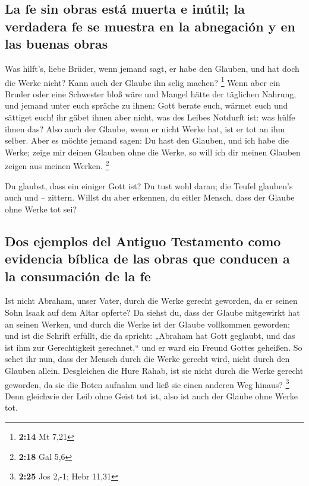 \hypertarget{la-fe-sin-obras-estuxe1-muerta-e-inuxfatil-la-verdadera-fe-se-muestra-en-la-abnegaciuxf3n-y-en-las-buenas-obras}{%
\subsection{La fe sin obras está muerta e inútil; la verdadera fe se
muestra en la abnegación y en las buenas
obras}\label{la-fe-sin-obras-estuxe1-muerta-e-inuxfatil-la-verdadera-fe-se-muestra-en-la-abnegaciuxf3n-y-en-las-buenas-obras}}

 Was hilft's, liebe Brüder, wenn jemand sagt, er habe den
Glauben, und hat doch die Werke nicht? Kann auch der Glaube ihn selig
machen? \footnote{\textbf{2:14} Mt 7,21}  Wenn aber ein
Bruder oder eine Schwester bloß wäre und Mangel hätte der täglichen
Nahrung,  und jemand unter euch spräche zu ihnen: Gott
berate euch, wärmet euch und sättiget euch! ihr gäbet ihnen aber nicht,
was des Leibes Notdurft ist: was hülfe ihnen das?  Also
auch der Glaube, wenn er nicht Werke hat, ist er tot an ihm selber.
 Aber es möchte jemand sagen: Du hast den Glauben, und
ich habe die Werke; zeige mir deinen Glauben ohne die Werke, so will ich
dir meinen Glauben zeigen aus meinen Werken. \footnote{\textbf{2:18} Gal
  5,6}

 Du glaubst, dass ein einiger Gott ist? Du tust wohl
daran; die Teufel glauben's auch und -- zittern.  Willst
du aber erkennen, du eitler Mensch, dass der Glaube ohne Werke tot sei?

\hypertarget{dos-ejemplos-del-antiguo-testamento-como-evidencia-buxedblica-de-las-obras-que-conducen-a-la-consumaciuxf3n-de-la-fe}{%
\subsection{Dos ejemplos del Antiguo Testamento como evidencia bíblica
de las obras que conducen a la consumación de la
fe}\label{dos-ejemplos-del-antiguo-testamento-como-evidencia-buxedblica-de-las-obras-que-conducen-a-la-consumaciuxf3n-de-la-fe}}

 Ist nicht Abraham, unser Vater, durch die Werke gerecht
geworden, da er seinen Sohn Isaak auf dem Altar opferte? 
Da siehst du, dass der Glaube mitgewirkt hat an seinen Werken, und durch
die Werke ist der Glaube vollkommen geworden;  und ist
die Schrift erfüllt, die da spricht: „Abraham hat Gott geglaubt, und das
ist ihm zur Gerechtigkeit gerechnet,`` und er ward ein Freund Gottes
geheißen.  So sehet ihr nun, dass der Mensch durch die
Werke gerecht wird, nicht durch den Glauben allein. 
Desgleichen die Hure Rahab, ist sie nicht durch die Werke gerecht
geworden, da sie die Boten aufnahm und ließ sie einen anderen Weg
hinaus? \footnote{\textbf{2:25} Jos 2,-1; Hebr 11,31} 
Denn gleichwie der Leib ohne Geist tot ist, also ist auch der Glaube
ohne Werke tot.

